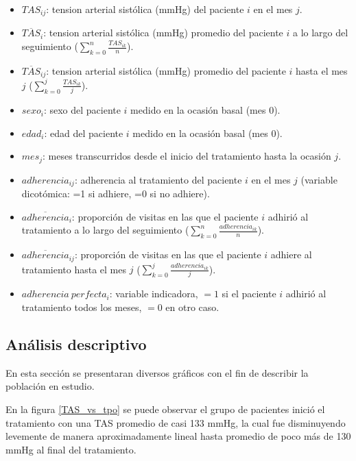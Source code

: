 \documentclass[spanish]{article}
\numberwithin{figure}{subsection}
\numberwithin{equation}{subsection}
\numberwithin{table}{subsection}
\begin{document}
\begin{itemize}
	\item $TAS_{ij}$: tension arterial sistólica (mmHg) del paciente $i$ en el
	mes $j$.
	\item $\overline{TAS}_{i}$: tension arterial sistólica (mmHg) promedio del
	paciente $i$ a lo largo del seguimiento ($\sum_{k=0}^n \frac{TAS_{ik}}{n}$).
	\item $\overline{TAS}_{ij}$: tension arterial sistólica (mmHg) promedio del
	paciente $i$ hasta el mes $j$ ($\sum_{k=0}^j \frac{TAS_{ik}}{j}$).
	\item $sexo_i$: sexo del paciente $i$ medido en la ocasión basal (mes 0).
	\item $edad_i$: edad del paciente $i$ medido en la ocasión basal (mes 0).
	\item $mes_j$: meses transcurridos desde el inicio del tratamiento hasta la
	ocasión $j$.
	\item $adherencia_{ij}$: adherencia al tratamiento del paciente $i$ en el
	mes $j$ (variable dicotómica: =1 si adhiere, =0 si no adhiere).
	\item $\overline{adherencia}_i$: proporción de visitas en las que el
	paciente $i$ adhirió al tratamiento a lo largo del seguimiento
	($\sum_{k=0}^n \frac{adherencia_{ik}}{n}$).
	\item $\overline{adherencia}_{ij}$: proporción de visitas en las que el
	paciente $i$ adhiere al tratamiento hasta el mes $j$ ($\sum_{k=0}^j
	\frac{adherencia_{ik}}{j}$).
	\item $adherencia\ perfecta_i$: variable indicadora, $=1$ si el paciente
	$i$ adhirió al tratamiento todos los meses, $=0$ en otro caso.
\end{itemize}

\subsection{Análisis descriptivo}

En esta sección se presentaran diversos gráficos con el fin de describir la
población en estudio.

En la figura \ref{TAS_vs_tpo} se puede observar el grupo de pacientes inició el
tratamiento con una TAS promedio de casi 133 mmHg, la cual fue disminuyendo
levemente de manera aproximadamente lineal hasta promedio de poco más de 130
mmHg al final del tratamiento.
\end{document}
